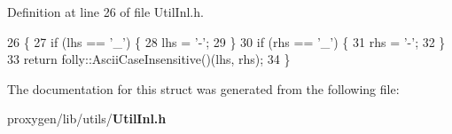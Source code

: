 Definition at line 26 of file Util\+Inl.\+h.


\begin{DoxyCode}
26                                             \{
27     \textcolor{keywordflow}{if} (lhs == \textcolor{charliteral}{'\_'}) \{
28       lhs = \textcolor{charliteral}{'-'};
29     \}
30     \textcolor{keywordflow}{if} (rhs == \textcolor{charliteral}{'\_'}) \{
31       rhs = \textcolor{charliteral}{'-'};
32     \}
33     \textcolor{keywordflow}{return} folly::AsciiCaseInsensitive()(lhs, rhs);
34   \}
\end{DoxyCode}


The documentation for this struct was generated from the following file\+:\begin{DoxyCompactItemize}
\item 
proxygen/lib/utils/{\bf Util\+Inl.\+h}\end{DoxyCompactItemize}
